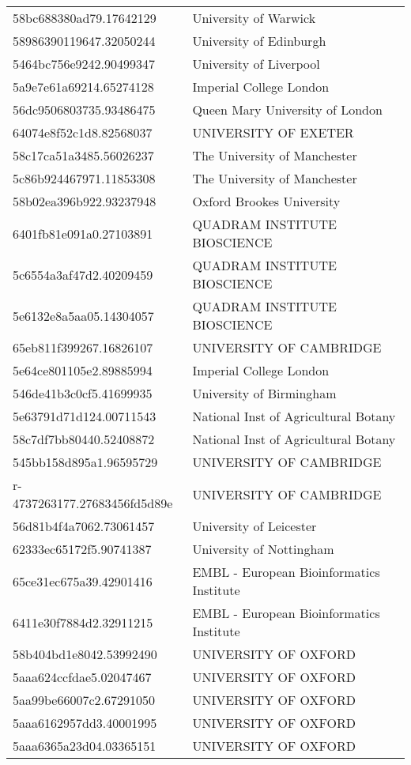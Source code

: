 \begin{tabular}{ll}
58bc688380ad79.17642129 & University of Warwick \\
58986390119647.32050244 & University of Edinburgh \\
5464bc756e9242.90499347 & University of Liverpool \\
5a9e7e61a69214.65274128 & Imperial College London \\
56dc9506803735.93486475 & Queen Mary University of London \\
64074e8f52c1d8.82568037 & UNIVERSITY OF EXETER \\
58c17ca51a3485.56026237 & The University of Manchester \\
5c86b924467971.11853308 & The University of Manchester \\
58b02ea396b922.93237948 & Oxford Brookes University \\
6401fb81e091a0.27103891 & QUADRAM INSTITUTE BIOSCIENCE \\
5c6554a3af47d2.40209459 & QUADRAM INSTITUTE BIOSCIENCE \\
5e6132e8a5aa05.14304057 & QUADRAM INSTITUTE BIOSCIENCE \\
65eb811f399267.16826107 & UNIVERSITY OF CAMBRIDGE \\
5e64ce801105e2.89885994 & Imperial College London \\
546de41b3c0cf5.41699935 & University of Birmingham \\
5e63791d71d124.00711543 & National Inst of Agricultural Botany \\
58c7df7bb80440.52408872 & National Inst of Agricultural Botany \\
545bb158d895a1.96595729 & UNIVERSITY OF CAMBRIDGE \\
r-4737263177.27683456fd5d89e & UNIVERSITY OF CAMBRIDGE \\
56d81b4f4a7062.73061457 & University of Leicester \\
62333ec65172f5.90741387 & University of Nottingham \\
65ce31ec675a39.42901416 & EMBL - European Bioinformatics Institute \\
6411e30f7884d2.32911215 & EMBL - European Bioinformatics Institute \\
58b404bd1e8042.53992490 & UNIVERSITY OF OXFORD \\
5aaa624ccfdae5.02047467 & UNIVERSITY OF OXFORD \\
5aa99be66007c2.67291050 & UNIVERSITY OF OXFORD \\
5aaa6162957dd3.40001995 & UNIVERSITY OF OXFORD \\
5aaa6365a23d04.03365151 & UNIVERSITY OF OXFORD \\

\end{tabular}
